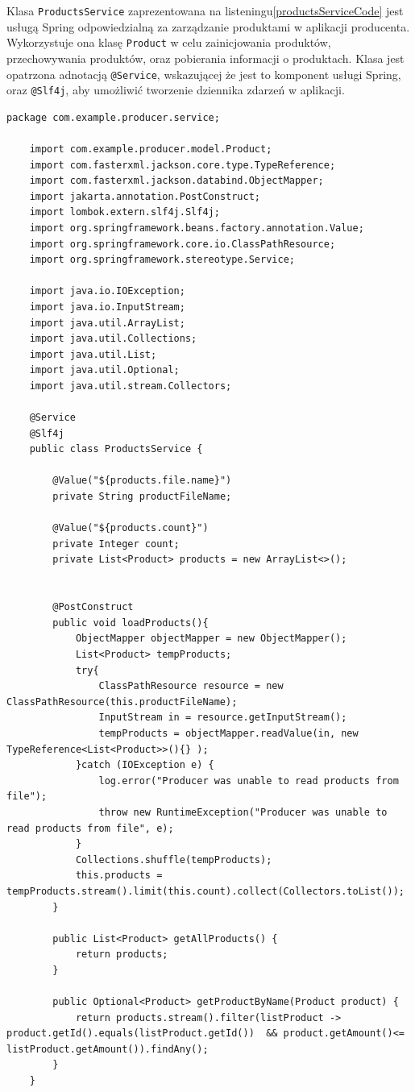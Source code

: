Klasa \verb|ProductsService| zaprezentowana na listeningu\ref{productsServiceCode} jest usługą Spring odpowiedzialną za zarządzanie produktami w aplikacji producenta. Wykorzystuje ona klasę \verb|Product| w celu zainicjowania produktów, przechowywania produktów, oraz pobierania informacji o produktach. Klasa jest opatrzona adnotacją \verb|@Service|, wskazującej że jest to komponent usługi Spring, oraz \verb|@Slf4j|, aby umożliwić tworzenie dziennika zdarzeń w aplikacji.

\begin{lstlisting}[caption=Kod klasy ProductsService, label=productsServiceCode]
    package com.example.producer.service;

    import com.example.producer.model.Product;
    import com.fasterxml.jackson.core.type.TypeReference;
    import com.fasterxml.jackson.databind.ObjectMapper;
    import jakarta.annotation.PostConstruct;
    import lombok.extern.slf4j.Slf4j;
    import org.springframework.beans.factory.annotation.Value;
    import org.springframework.core.io.ClassPathResource;
    import org.springframework.stereotype.Service;
    
    import java.io.IOException;
    import java.io.InputStream;
    import java.util.ArrayList;
    import java.util.Collections;
    import java.util.List;
    import java.util.Optional;
    import java.util.stream.Collectors;
    
    @Service
    @Slf4j
    public class ProductsService {
    
        @Value("${products.file.name}")
        private String productFileName;
    
        @Value("${products.count}")
        private Integer count;
        private List<Product> products = new ArrayList<>();


        @PostConstruct
        public void loadProducts(){
            ObjectMapper objectMapper = new ObjectMapper();
            List<Product> tempProducts;
            try{
                ClassPathResource resource = new ClassPathResource(this.productFileName);
                InputStream in = resource.getInputStream();
                tempProducts = objectMapper.readValue(in, new TypeReference<List<Product>>(){} );
            }catch (IOException e) {
                log.error("Producer was unable to read products from file");
                throw new RuntimeException("Producer was unable to read products from file", e);
            }
            Collections.shuffle(tempProducts);
            this.products = tempProducts.stream().limit(this.count).collect(Collectors.toList());
        }

        public List<Product> getAllProducts() {
            return products;
        }

        public Optional<Product> getProductByName(Product product) {
            return products.stream().filter(listProduct ->  product.getId().equals(listProduct.getId())  && product.getAmount()<= listProduct.getAmount()).findAny();
        }
    }
\end{lstlisting}


